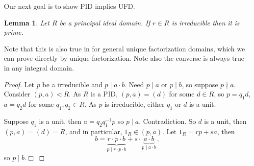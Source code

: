 \documentclass{article}
\theoremstyle{plain}\theoremheaderfont{\normalfont\itshape}\theorembodyfont{\rmfamily}\theoremseparator{.}\newtheorem*{rem}{Remark}\newtheorem*{ex}{Example}\newtheorem*{proof}{Proof}\newtheorem*{altp}{Alternative proof}\newtheorem*{nonex}{Non-Example}
\theoremstyle{plain}\theoremheaderfont{\normalfont\bfseries}\theorembodyfont{\rmfamily}\theoremseparator{.}\newtheorem{thm}{Theorem}[section]\newtheorem{lem}[thm]{Lemma}\newtheorem{prop}[thm]{Proposition}\newtheorem*{cor}{Corollary}\newtheorem{defn}[thm]{Definition}\newtheorem{clm}[thm]{Claim}\newtheorem{clminproof}{Claim}\newtheorem*{notn}{Notation}\newtheorem*{exer}{Exercise}\newtheorem*{lemnn}{Lemma}
\theoremstyle{break}\theoremheaderfont{\normalfont\itshape}\theorembodyfont{\rmfamily}\theoremseparator{.\medskip}\newtheorem*{proofskip}{Proof}\newtheorem*{exs}{Examples}\newtheorem*{rems}{Remarks}\newtheorem*{obs}{Observations}
\theoremstyle{break}\theoremheaderfont{\normalfont\bfseries}\theorembodyfont{\rmfamily}\theoremseparator{.\medskip}\newtheorem{lemskip}[thm]{Lemma}\newtheorem{defnskip}[thm]{Definition}\newtheorem{propskip}[thm]{Proposition}\newtheorem{thmskip}[thm]{Theorem}
\numberwithin{equation}{section}
\newcommand{\qed}{\hfill\ensuremath{\Box}}
\begin{document}
    Our next goal is to show PID implies UFD.
    \begin{lem}
        Let \(R\) be a principal ideal domain. If \(r\in R\) is irreducible then it is prime.
    \end{lem}
    Note that this is also true in for general unique factorization domains, which we can prove directly by unique factorization. Note also the converse is always true in any integral domain.
    \begin{proof}
        Let \(p\) be a irreducible and \(p\mid a\cdot b\). Need \(p\mid a\) or \(p\mid b\), so suppose \(p\nmid a\). Consider \((p,a)\lhd R\). As \(R\) is a PID, \((p,a)=(d)\) for some \(d\in R\), so \(p=q_1d\), \(a=q_2d\) for some \(q_1,q_2\in R\). As \(p\) is irreducible, either \(q_1\) or \(d\) is a unit.
        
        Suppose \(q_1\) is a unit, then \(a=q_2 q_1^{-1}p\) so \(p\mid a\). Contradiction. So \(d\) is a unit, then \((p,a)=(d)=R\), and in particular, \(1_R\in (p,a)\). Let \(1_R=rp+sa\), then
        \[b=\underbrace{r\cdot p\cdot b}_{p\mid r\cdot p\cdot b}+s\cdot\underbrace{a\cdot b}_{p\mid a\cdot b}\,,\]
        so \(p\mid b\).\qed
    \end{proof}
\end{document}
